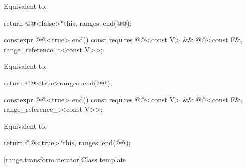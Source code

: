 \begin{itemdescr}
\pnum
\effects
Equivalent to:
\begin{codeblock}
return @@<false>{*this, ranges::end(@@)};
\end{codeblock}
\end{itemdescr}

%
\begin{itemdecl}
constexpr @@<true> end() const
  requires @@<const V> &&
           @@<const F&, range_reference_t<const V>>;
\end{itemdecl}

\begin{itemdescr}
\pnum
\effects
Equivalent to:
\begin{codeblock}
return @@<true>{ranges::end(@@)};
\end{codeblock}
\end{itemdescr}

%
\begin{itemdecl}
constexpr @@<true> end() const
  requires @@<const V> &&
           @@<const F&, range_reference_t<const V>>;
\end{itemdecl}

\begin{itemdescr}
\pnum
\effects
Equivalent to:
\begin{codeblock}
return @@<true>{*this, ranges::end(@@)};
\end{codeblock}
\end{itemdescr}

[range.transform.iterator]{Class template }

